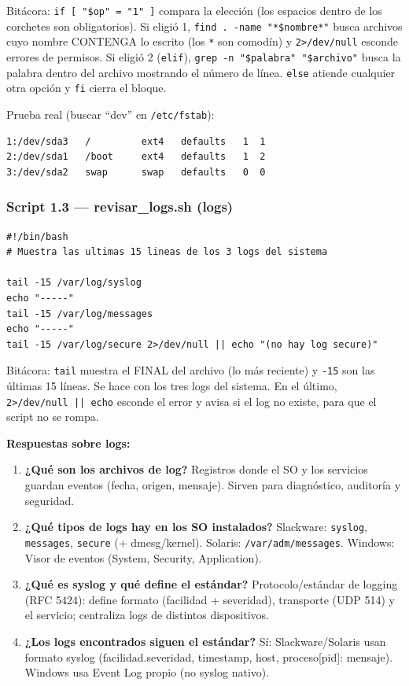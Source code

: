 Bitácora: \texttt{if [ "\$op" = "1" ]} compara la elección (los espacios dentro de los corchetes son obligatorios). Si eligió 1, \texttt{find . -name "*\$nombre*"} busca archivos cuyo nombre CONTENGA lo escrito (los \texttt{*} son comodín) y \texttt{2>/dev/null} esconde errores de permisos. Si eligió 2 (\texttt{elif}), \texttt{grep -n "\$palabra" "\$archivo"} busca la palabra dentro del archivo mostrando el número de línea. \texttt{else} atiende cualquier otra opción y \texttt{fi} cierra el bloque.

Prueba real (buscar ``dev'' en \texttt{/etc/fstab}):

\begin{lstlisting}
1:/dev/sda3   /         ext4   defaults   1  1
2:/dev/sda1   /boot     ext4   defaults   1  2
3:/dev/sda2   swap      swap   defaults   0  0
\end{lstlisting}

\subsubsection{Script 1.3 --- revisar\_logs.sh (logs)}

\begin{lstlisting}
#!/bin/bash
# Muestra las ultimas 15 lineas de los 3 logs del sistema

tail -15 /var/log/syslog
echo "-----"
tail -15 /var/log/messages
echo "-----"
tail -15 /var/log/secure 2>/dev/null || echo "(no hay log secure)"
\end{lstlisting}

Bitácora: \texttt{tail} muestra el FINAL del archivo (lo más reciente) y \texttt{-15} son las últimas 15 líneas. Se hace con los tres logs del sistema. En el último, \texttt{2>/dev/null || echo} esconde el error y avisa si el log no existe, para que el script no se rompa.

\textbf{Respuestas sobre logs:}
\begin{enumerate}
  \item \textbf{¿Qué son los archivos de log?} Registros donde el SO y los servicios guardan eventos (fecha, origen, mensaje). Sirven para diagnóstico, auditoría y seguridad.
  \item \textbf{¿Qué tipos de logs hay en los SO instalados?} Slackware: \texttt{syslog}, \texttt{messages}, \texttt{secure} (+ dmesg/kernel). Solaris: \texttt{/var/adm/messages}. Windows: Visor de eventos (System, Security, Application).
  \item \textbf{¿Qué es syslog y qué define el estándar?} Protocolo/estándar de logging (RFC 5424): define formato (facilidad + severidad), transporte (UDP 514) y el servicio; centraliza logs de distintos dispositivos.
  \item \textbf{¿Los logs encontrados siguen el estándar?} Sí: Slackware/Solaris usan formato syslog (facilidad.severidad, timestamp, host, proceso[pid]: mensaje). Windows usa Event Log propio (no syslog nativo).
\end{enumerate}

